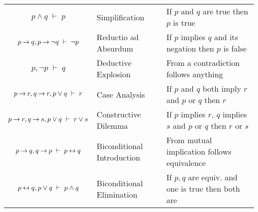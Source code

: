 \begin{tabular}{c l l}
  $p \wedge q \;\vdash\; p$                                    & 
  Simplification                                                & 
  If $p$ and $q$ are true then $p$ is true                      \\    
  
  $p \mathbin{\rightarrow} q, p \mathbin{\rightarrow} \neg q \;\vdash\; \neg p$                & 
  Reductio ad Absurdum                                          & 
  If $p$ implies $q$ and its negation then $p$ is false         \\ 
  
  $p, \neg p \;\vdash\; q$                                     & 
  Deductive Explosion                                           & 
  From a contradiction follows anything                         \\   
  
  $p \mathbin{\rightarrow} r, q \mathbin{\rightarrow} r, p \vee q \;\vdash\; r$                & 
  Case Analysis                                                 & 
  If $p$ and $q$ both imply $r$ and $p$ or $q$ then $r$         \\ 
  
  $p \mathbin{\rightarrow} r, q \mathbin{\rightarrow} s, p \vee q \;\vdash\; r \vee s$         & 
  Constructive Dilemma                                          & 
  If $p$ implies $r$, $q$ implies $s$ and $p$ or $q$ then $r$ or $s$         \\ 
  
  $p \mathbin{\rightarrow} q, q \mathbin{\rightarrow} p \;\vdash\; p \mathbin{\leftrightarrow} q$                & 
  Biconditional Introduction                                    & 
  From mutual implication follows equivalence                   \\   
  
  $p \mathbin{\leftrightarrow} q, p \vee q \;\vdash\; p \wedge q$                & 
  Biconditional Elimination                                     & 
  If $p,q$ are equiv. and one is true then both are         \\     
  
\end{tabular}
\medskip














